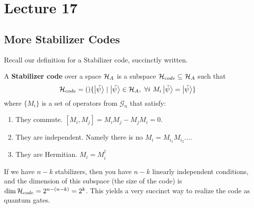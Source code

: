 \section{Lecture 17}

\subsection{More Stabilizer Codes}
Recall our definition for a Stabilizer code, succinctly written.
\begin{definition}
    A \textbf{Stabilizer code} over a space $\operatorname{\mathcal{H}}_A$ is a subspace $\operatorname{\mathcal{H}}_{code} \subseteq \operatorname{\mathcal{H}}_A$
    such that
    \[ \operatorname{\mathcal{H}}_{code} = \qty\{ \ket{\tilde{\psi}} \mid \ket{\tilde{\psi}} \in \operatorname{\mathcal{H}}_A, \text{ } \forall i \text{ } M_i \ket{\tilde{\psi}} = \ket{\tilde{\psi}} \} \]
    where $\{ M_i\}$ is a set of operators from $\mathcal{G}_n$ that satisfy:
    \begin{enumerate}
        \item They commute. $[M_i, M_j] = M_i M_j - M_j M_i = 0$.
        \item They are independent. Namely there is no $M_i = M_{i_1} M_{i_2} \dots$.
        \item They are Hermitian. $M_i = M_i^{\dagger}$
    \end{enumerate} 
\end{definition}

If we have $n - k$ stabilizers, then you have $n - k$ linearly independent conditions,
and the dimension of this subspace (the size of the code) is $\dim \operatorname{\mathcal{H}}_{code} = 2^{n - (n - k)} = 2^k$.
This yields a very succinct way to realize the code as quantum gates.

